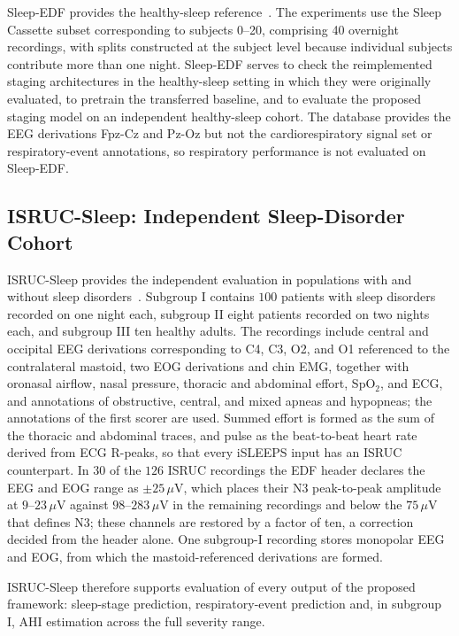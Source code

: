 \documentclass[a4paper,fleqn]{cas-sc}
\begin{document}
Sleep-EDF provides the healthy-sleep reference~\cite{kemp2000sleepedf,goldberger2000physionet}.
The experiments use the Sleep Cassette subset corresponding to subjects 0--20, comprising 40
overnight recordings, with splits constructed at the subject level because individual subjects
contribute more than one night. Sleep-EDF serves to check the reimplemented staging architectures
in the healthy-sleep setting in which they were originally evaluated, to pretrain the transferred
baseline, and to evaluate the proposed staging model on an independent healthy-sleep cohort. The
database provides the EEG derivations Fpz-Cz and Pz-Oz but not the cardiorespiratory signal set or
respiratory-event annotations, so respiratory performance is not evaluated on Sleep-EDF.

\subsection{ISRUC-Sleep: Independent Sleep-Disorder Cohort}

ISRUC-Sleep provides the independent evaluation in populations with and without
sleep disorders~\cite{khalighi2016isruc}. Subgroup I contains $100$ patients with
sleep disorders recorded on one night each, subgroup II eight patients recorded
on two nights each, and subgroup III ten healthy adults. The recordings include
central and occipital EEG derivations corresponding to C4, C3, O2, and O1
referenced to the contralateral mastoid, two EOG derivations and chin EMG,
together with oronasal airflow, nasal pressure, thoracic and abdominal effort,
SpO$_2$, and ECG, and annotations of obstructive, central, and mixed apneas and
hypopneas; the annotations of the first scorer are used. Summed effort is formed
as the sum of the thoracic and abdominal traces, and pulse as the beat-to-beat
heart rate derived from ECG R-peaks, so that every iSLEEPS input has an ISRUC
counterpart. In $30$ of the $126$ ISRUC recordings the EDF header declares the
EEG and EOG range as $\pm25\,\mu$V, which places their N3 peak-to-peak amplitude
at $9$--$23\,\mu$V against $98$--$283\,\mu$V in the remaining recordings and below
the $75\,\mu$V that defines N3; these channels are restored by a factor of ten, a
correction decided from the header alone. One subgroup-I recording stores
monopolar EEG and EOG, from which the mastoid-referenced derivations are formed.

ISRUC-Sleep therefore supports evaluation of every output of the proposed
framework: sleep-stage prediction, respiratory-event prediction and, in subgroup I,
AHI estimation across the full severity range.
\end{document}
